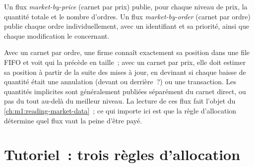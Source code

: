 \begin{definition}\label{def:m1:matching-algorithms-and-implied-spreads:mbo}
Un flux \emph{market-by-price} (carnet par prix) publie, pour chaque
niveau de prix, la quantité totale et le nombre d'ordres. Un flux
\emph{market-by-order} (carnet par ordre) publie chaque ordre
individuellement, avec un identifiant et sa priorité, ainsi que chaque modification le concernant.
\end{definition}

Avec un carnet par ordre, une firme connaît exactement sa position dans une file FIFO
et voit qui la précède en taille~; avec un carnet par prix, elle doit estimer sa
position à partir de la suite des mises à jour, en devinant si chaque baisse de
quantité était une annulation (devant ou derrière~?) ou une transaction. Les quantités implicites
sont généralement publiées séparément du carnet direct, ou pas du tout
au-delà du meilleur niveau. La lecture de ces flux fait l'objet du
\cref{ch:m1:reading-market-data}~; ce qui importe ici est que la règle d'allocation
détermine quel flux vaut la peine d'être payé.

\section{Tutoriel~: trois règles d'allocation}\label{tut:m1:matching-algorithms-and-implied-spreads:alloc}

